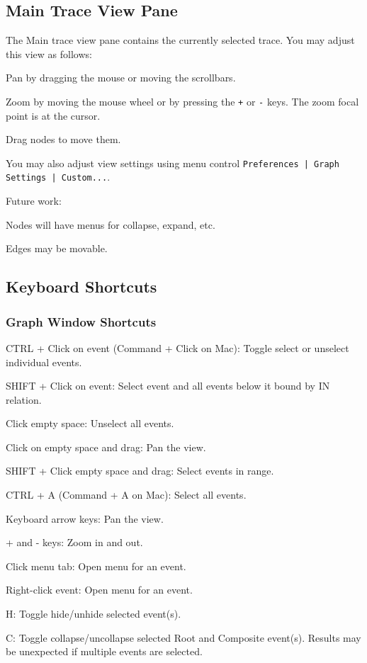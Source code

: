 \documentclass[11pt,fleqn]{article} %
\begin{document}
\subsection{Main Trace View Pane}
The Main trace view pane contains the currently selected trace.
You may adjust this view as follows:
\begin{compactitem}
\item Pan by dragging the mouse or moving the scrollbars.
\item Zoom by moving the mouse wheel or by pressing the \verb.+. or \verb+-+ keys. The zoom focal point is at the cursor.
\item Drag nodes to move them.
\item You may also adjust view settings using menu control \verb+Preferences | Graph Settings | Custom...+.
\item Future work:
  \begin{compactitem}
  \item Nodes will have menus for collapse, expand, etc.
  \item Edges may be movable.
  \end{compactitem}
\end{compactitem}

\subsection{Keyboard Shortcuts}
\subsubsection{Graph Window Shortcuts}
\begin{compactitem}
\item CTRL + Click on event (Command + Click on Mac): Toggle select or unselect individual events.
\item SHIFT + Click on event: Select event and all events below it bound by IN relation.
\item Click empty space: Unselect all events.
\item Click on empty space and drag: Pan the view.
\item SHIFT + Click empty space and drag: Select events in range.
\item CTRL + A (Command + A on Mac): Select all events.
\item Keyboard arrow keys: Pan the view.
\item + and - keys: Zoom in and out.
\item Click menu tab: Open menu for an event.
\item Right-click event: Open menu for an event.
\item H: Toggle hide/unhide selected event(s).
\item C: Toggle collapse/uncollapse selected Root and Composite event(s). Results may be unexpected if multiple events are selected.
\end{compactitem}
\end{document}

